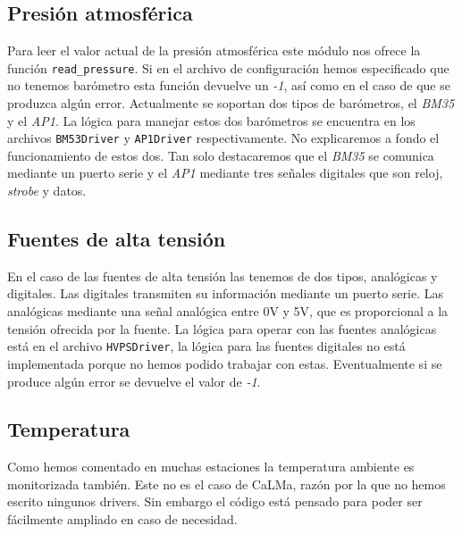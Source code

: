         \subsection{Presión atmosférica}
            Para leer el valor actual de la presión atmosférica este módulo nos
            ofrece la función \texttt{read\_pressure}. Si en el archivo de
            configuración hemos especificado que no tenemos barómetro esta
            función devuelve un \emph{-1}, así como en el caso de que se
            produzca algún error. Actualmente se soportan dos tipos de
            barómetros, el \emph{BM35} y el \emph{AP1}. La lógica para manejar
            estos dos barómetros se encuentra en los archivos
            \texttt{BM53Driver} y \texttt{AP1Driver} respectivamente. No
            explicaremos a fondo el funcionamiento de estos dos. Tan solo
            destacaremos que el \emph{BM35} se comunica mediante un puerto
            serie y el \emph{AP1} mediante tres señales digitales que son
            reloj, \emph{strobe} y datos.
        \subsection{Fuentes de alta tensión}
            En el caso de las fuentes de alta tensión las tenemos de dos tipos,
            analógicas y digitales. Las digitales transmiten su información
            mediante un puerto serie. Las analógicas mediante una señal
            analógica entre 0V y 5V, que es proporcional a la tensión ofrecida
            por la fuente. La lógica para operar con las fuentes analógicas
            está en el archivo \texttt{HVPSDriver}, la lógica para las fuentes
            digitales no está implementada porque no hemos podido trabajar con
            estas. Eventualmente si se produce algún error se devuelve el valor
            de \emph{-1}.
        \subsection{Temperatura}
            Como hemos comentado en muchas estaciones la temperatura ambiente
            es monitorizada también. Este no es el caso de CaLMa, razón por la
            que no hemos escrito ningunos drivers. Sin embargo el código está
            pensado para poder ser fácilmente ampliado en caso de necesidad.
